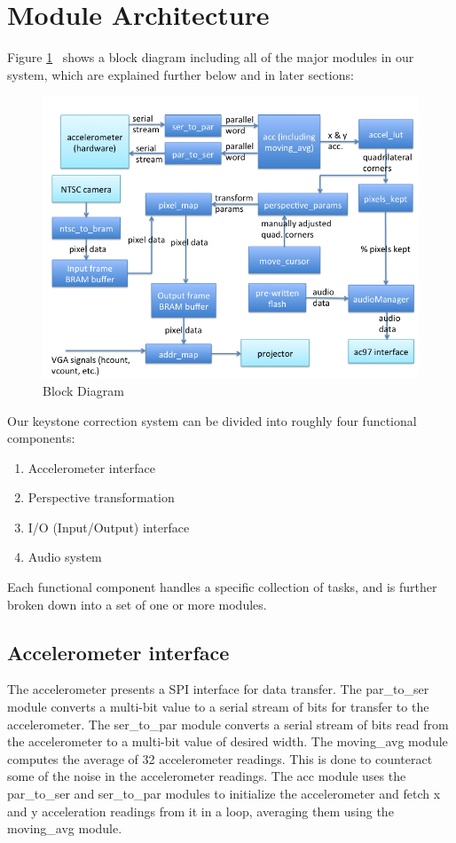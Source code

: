 \documentclass{article}
\begin{document}
\section{Module Architecture}
Figure \ref{fig:block_diag}~ shows a block diagram including all of the major modules in our system, which are explained further below and in later sections:
\begin{center}
\begin{figure}[H]
\caption{Block Diagram}
\label{fig:block_diag}
\centering
\includegraphics[width=\textwidth]{./img/block_diag}
\end{figure}
\end{center}

Our keystone correction system can be divided into roughly four functional components:
\begin{enumerate}
\item Accelerometer interface
\item Perspective transformation
\item I/O (Input/Output) interface
\item Audio system
\end{enumerate}

Each functional component handles a specific collection of tasks, and is further broken down into a set of one or more modules.

\subsection{Accelerometer interface}
The accelerometer presents a SPI interface for data transfer.
The par\_to\_ser module converts a multi-bit value to a serial stream of bits for transfer to the accelerometer.
The ser\_to\_par module converts a serial stream of bits read from the accelerometer to a multi-bit value of desired width.
The moving\_avg module computes the average of 32 accelerometer readings.
This is done to counteract some of the noise in the accelerometer readings.
The acc module uses the par\_to\_ser and ser\_to\_par modules to initialize the accelerometer and fetch x and y acceleration readings from it in a loop,
averaging them using the moving\_avg module.
\end{document}
